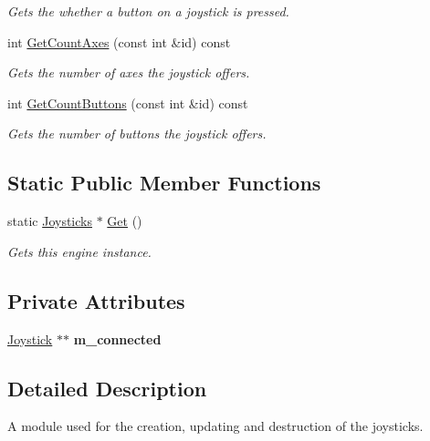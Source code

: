 \begin{DoxyCompactItemize}
\begin{DoxyCompactList}\small\item\em Gets the whether a button on a joystick is pressed. \end{DoxyCompactList}\item 
int \hyperlink{class_flounder_1_1_joysticks_a52bbd93ad4cd39e07f163b0f87eaadf6}{Get\+Count\+Axes} (const int \&id) const
\begin{DoxyCompactList}\small\item\em Gets the number of axes the joystick offers. \end{DoxyCompactList}\item 
int \hyperlink{class_flounder_1_1_joysticks_a25cca50c5d9d1081880ed4f4c0ee38e8}{Get\+Count\+Buttons} (const int \&id) const
\begin{DoxyCompactList}\small\item\em Gets the number of buttons the joystick offers. \end{DoxyCompactList}\end{DoxyCompactItemize}
\subsection*{Static Public Member Functions}
\begin{DoxyCompactItemize}
\item 
static \hyperlink{class_flounder_1_1_joysticks}{Joysticks} $\ast$ \hyperlink{class_flounder_1_1_joysticks_ad64ff5ab393e75d14ba3af58e7aa3ef6}{Get} ()
\begin{DoxyCompactList}\small\item\em Gets this engine instance. \end{DoxyCompactList}\end{DoxyCompactItemize}
\subsection*{Private Attributes}
\begin{DoxyCompactItemize}
\item 
\mbox{\label{class_flounder_1_1_joysticks_a49427f66ff5a71c2fe297967436f1b1d}} 
\hyperlink{struct_flounder_1_1_joystick}{Joystick} $\ast$$\ast$ {\bfseries m\+\_\+connected}
\end{DoxyCompactItemize}


\subsection{Detailed Description}
A module used for the creation, updating and destruction of the joysticks. 



